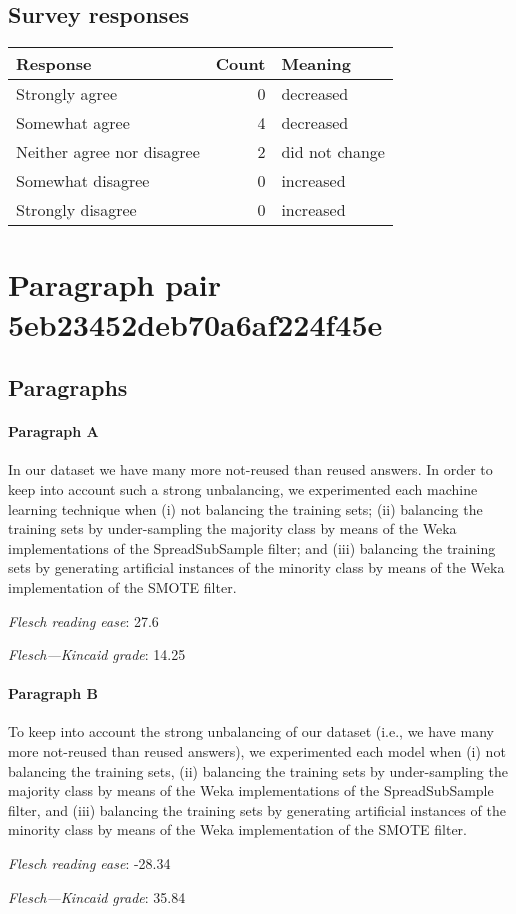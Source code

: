 \subsection{Survey responses}
\begin{tabular}{lrl}
\toprule
          \textbf{Response} &  \textbf{Count} & \textbf{Meaning} \\
\midrule
             Strongly agree &               0 &        decreased \\
             Somewhat agree &               4 &        decreased \\
 Neither agree nor disagree &               2 &   did not change \\
          Somewhat disagree &               0 &        increased \\
          Strongly disagree &               0 &        increased \\
\bottomrule
\end{tabular}

\section{Paragraph pair 5eb23452deb70a6af224f45e}
\subsection{Paragraphs}
\paragraph{Paragraph A}
In our dataset we have many more not-reused than reused answers. In order to keep into account such a strong unbalancing, we experimented each machine learning technique when (i) not balancing the training sets; (ii) balancing the training sets by under-sampling the majority class by means of the Weka implementations of the SpreadSubSample filter; and (iii) balancing the training sets by generating artificial instances of the minority class by means of the Weka implementation of the SMOTE filter.\par\medskip
\emph{Flesch reading ease}: 27.6\par
\emph{Flesch---Kincaid grade}: 14.25

\paragraph{Paragraph B}
To keep into account the strong unbalancing of our dataset (i.e., we have many more not-reused than reused answers), we experimented each model when (i) not balancing the training sets, (ii) balancing the training sets by under-sampling the majority class by means of the Weka implementations of the SpreadSubSample filter, and (iii) balancing the training sets by generating artificial instances of the minority class by means of the Weka implementation of the SMOTE filter.\par\medskip
\emph{Flesch reading ease}: -28.34\par
\emph{Flesch---Kincaid grade}: 35.84

